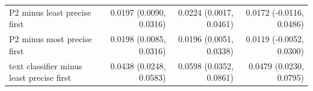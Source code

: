 \begin{tabular}{lrrr}
P2 minus least precise first & 0.0197 (0.0090, 0.0316) & 0.0224 (0.0017, 0.0461) & 0.0172 (-0.0116, 0.0486) \\
P2 minus most precise first & 0.0198 (0.0085, 0.0316) & 0.0196 (0.0051, 0.0338) & 0.0119 (-0.0052, 0.0300) \\
text classifier minus least precise first & 0.0438 (0.0248, 0.0583) & 0.0598 (0.0352, 0.0861) & 0.0479 (0.0230, 0.0795) \\

\end{tabular}
